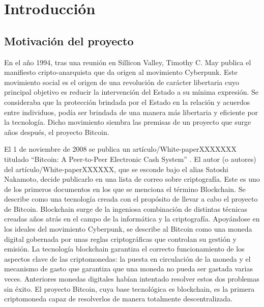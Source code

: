 \chapter{Introducción}
\section{Motivación del proyecto}

En el año 1994, tras una reunión en Sillicon Valley, Timothy C. May publica el manifiesto cripto-anarquista \cite{criptoanarquista} que da origen al movimiento Cyberpunk. Este movimiento social es el origen de una revolución de carácter libertaria cuyo principal objetivo es reducir la intervención del Estado a su mínima expresión. Se consideraba que la protección brindada por el Estado en la relación y acuerdos entre individuos, podía ser brindada de una manera más libertaria y eficiente por la tecnología. Dicho movimiento siembra las premisas de un proyecto que surge años después, el proyecto Bitcoin. \newline

El 1 de noviembre de 2008 se publica un artículo/White-paperXXXXXXX titulado “Bitcoin: A Peer-to-Peer Electronic Cash System” \cite{bitcoin}. El autor (o autores) del artículo/White-paperXXXXXX, que se esconde bajo el alias Satoshi Nakamoto, decide publicarlo en una lista de correo sobre criptografía. Este es uno de los primeros documentos en los que se menciona el término Blockchain. Se describe como una tecnología creada con el propósito de llevar a cabo el proyecto de Bitcoin. Blockchain surge de la ingeniosa combinación de distintas técnicas creadas años atrás en el campo de la informática y la criptografía. Apoyándose en los ideales del movimiento Cyberpunk, se describe al Bitcoin como una moneda digital gobernada por unas reglas criptográficas que controlan su gestión y emisión. La tecnología blockchain garantiza el correcto funcionamiento de los aspectos clave de las criptomonedas: la puesta en circulación de la moneda y el mecanismo de gasto que garantiza que una moneda no pueda ser gastada varias veces. Anteriores monedas digitales habían intentado resolver estos dos problemas sin éxito. El proyecto Bitcoin, cuya base tecnológica es blockchain, es la primera criptomoneda capaz de resolverlos de manera totalmente descentralizada. \newline

